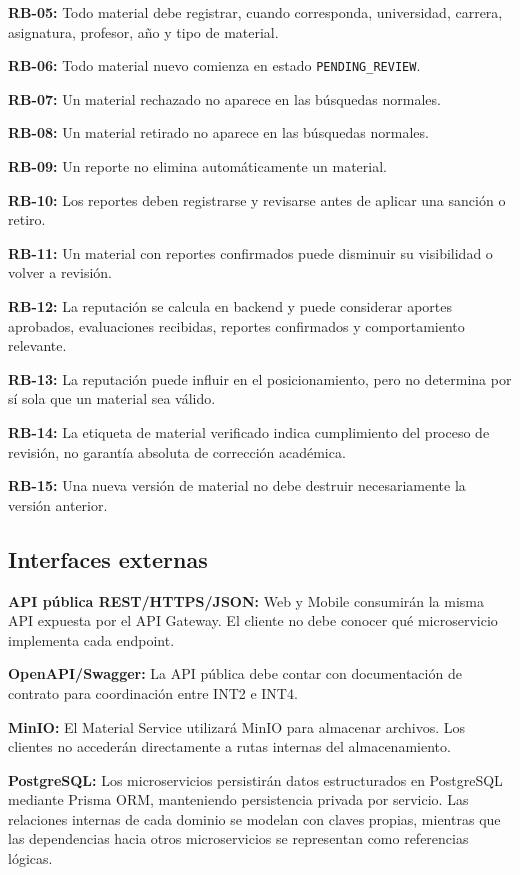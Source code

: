 \documentclass[12pt,a4paper]{article}
\begin{document}
\noindent\textbf{RB-05:} Todo material debe registrar, cuando corresponda, universidad, carrera, asignatura, profesor, año y tipo de material.

\noindent\textbf{RB-06:} Todo material nuevo comienza en estado \texttt{PENDING\_REVIEW}.

\noindent\textbf{RB-07:} Un material rechazado no aparece en las búsquedas normales.

\noindent\textbf{RB-08:} Un material retirado no aparece en las búsquedas normales.

\noindent\textbf{RB-09:} Un reporte no elimina automáticamente un material.

\noindent\textbf{RB-10:} Los reportes deben registrarse y revisarse antes de aplicar una sanción o retiro.

\noindent\textbf{RB-11:} Un material con reportes confirmados puede disminuir su visibilidad o volver a revisión.

\noindent\textbf{RB-12:} La reputación se calcula en backend y puede considerar aportes aprobados, evaluaciones recibidas, reportes confirmados y comportamiento relevante.

\noindent\textbf{RB-13:} La reputación puede influir en el posicionamiento, pero no determina por sí sola que un material sea válido.

\noindent\textbf{RB-14:} La etiqueta de material verificado indica cumplimiento del proceso de revisión, no garantía absoluta de corrección académica.

\noindent\textbf{RB-15:} Una nueva versión de material no debe destruir necesariamente la versión anterior.

\subsection{Interfaces externas}

\noindent\textbf{API pública REST/HTTPS/JSON:} Web y Mobile consumirán la misma API expuesta por el API Gateway. El cliente no debe conocer qué microservicio implementa cada endpoint.

\noindent\textbf{OpenAPI/Swagger:} La API pública debe contar con documentación de contrato para coordinación entre INT2 e INT4.

\noindent\textbf{MinIO:} El Material Service utilizará MinIO para almacenar archivos. Los clientes no accederán directamente a rutas internas del almacenamiento.

\noindent\textbf{PostgreSQL:} Los microservicios persistirán datos estructurados en PostgreSQL mediante Prisma ORM, manteniendo persistencia privada por servicio. Las relaciones internas de cada dominio se modelan con claves propias, mientras que las dependencias hacia otros microservicios se representan como referencias lógicas.
\end{document}
